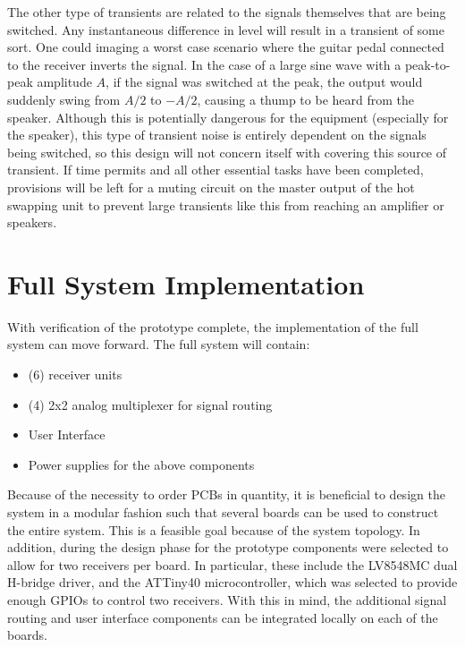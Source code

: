 \documentclass{article}
\begin{document}
	The other type of transients are related to the signals themselves that are being switched.  Any instantaneous difference in level will result in a transient of some sort.  One could imaging a worst case scenario where the guitar pedal connected to the receiver inverts the signal.  In the case of a large sine wave with a peak-to-peak amplitude $A$, if the signal was switched at the peak, the output would suddenly swing from $A/2$ to $-A/2$, causing a thump to be heard from the speaker.  Although this is potentially dangerous for the equipment (especially for the speaker), this type of transient noise is entirely dependent on the signals being switched, so this design will not concern itself with covering this source of transient.  If time permits and all other essential tasks have been completed, provisions will be left for a muting circuit on the master output of the hot swapping unit to prevent large transients like this from reaching an amplifier or speakers.



\newpage
\section{Full System Implementation}
	With verification of the prototype complete, the implementation of the full system can move forward.  The full system will contain:

	\begin{itemize}
		\item (6) receiver units
		\item (4) 2x2 analog multiplexer for signal routing
		\item User Interface
		\item Power supplies for the above components
	\end{itemize}

	Because of the necessity to order PCBs in quantity, it is beneficial to design the system in a modular fashion such that several boards can be used to construct the entire system.  This is a feasible goal because of the system topology.  In addition, during the design phase for the prototype components were selected to allow for two receivers per board.  In particular, these include the LV8548MC dual H-bridge driver, and the ATTiny40 microcontroller, which was selected to provide enough GPIOs to control two receivers.  With this in mind, the additional signal routing and user interface components can be integrated locally on each of the boards.
\end{document}

